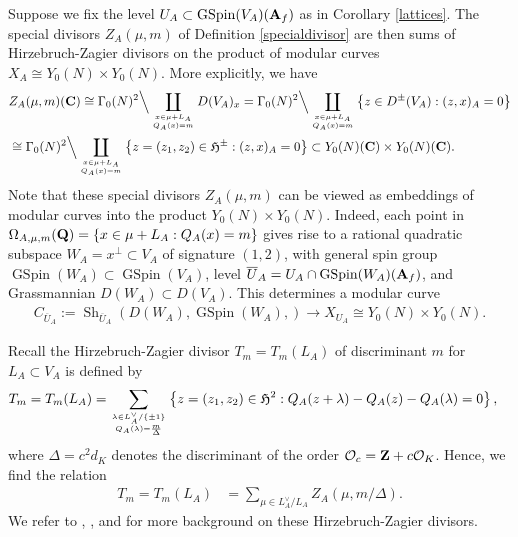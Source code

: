 \documentclass{amsart}
\theoremstyle{definition}
\newenvironment{remark}[1][Remark]{\begin{trivlist}
\item[\hskip \labelsep {\bfseries #1}]}{\end{trivlist}}
\begin{document}
Suppose we fix the level $U_A \subset \operatorname{GSpin}(V_A)({\bf{A}}_f)$ as in Corollary \ref{lattices}.
The special divisors $Z_A(\mu, m)$ of Definition \ref{specialdivisor} are then sums of Hirzebruch-Zagier divisors on the product of modular curves
$X_A \cong Y_0(N) \times Y_0(N)$. More explicitly, we have
\begin{equation*}\begin{aligned} &Z_A(\mu, m)({\bf{C}}) \cong \Gamma_0(N)^2 \Big\backslash \coprod\limits_{ x \in \mu + L_A \atop Q_A(x) = m } D(V_A)_x
= \Gamma_0(N)^2 \Big\backslash \coprod\limits_{ x \in \mu + L_A \atop Q_A(x) = m } \left\lbrace z \in D^{\pm}(V_A): (z, x)_A =0 \right\rbrace \\
&\cong  \Gamma_0(N)^2 \Big\backslash \coprod\limits_{ x \in \mu + L_A \atop Q_A(x) = m } \left\lbrace z=(z_1, z_2) \in \mathfrak{H}^{\pm}: (z, x)_A=0 \right\rbrace
 \subset Y_0(N)({\bf{C}}) \times Y_0(N)({\bf{C}}). \end{aligned}\end{equation*}
Note that these special divisors $Z_A(\mu, m)$ can be viewed as embeddings of modular curves into the product $Y_0(N) \times Y_0(N)$.
Indeed, each point in $\Omega_{A, \mu, m}({\bf{Q}}) = \lbrace x \in \mu + L_A: Q_A(x) = m \rbrace$
gives rise to a rational quadratic subspace $W_A = x^{\perp} \subset V_A$ of signature $(1,2)$, with general spin group
$\operatorname{GSpin}(W_A) \subset \operatorname{GSpin}(V_A)$, level $\overline{U}_A = U_A \cap \operatorname{GSpin}(W_A)({\bf{A}}_f)$,
and Grassmannian $D(W_A) \subset D(V_A)$. This determines a modular curve
\begin{align*} C_{\overline{U}_A}:= \operatorname{Sh}_{\overline{U}_A}(D(W_A), \operatorname{GSpin}(W_A), )
\longrightarrow X_{U_A}  \cong Y_0(N) \times Y_0(N). \end{align*}

\begin{remark} Recall the Hirzebruch-Zagier divisor $T_m = T_m(L_A)$ of discriminant  $m$ for $L_A \subset V_A$ is defined by 
\begin{align}\label{HZ} T_m = T_m(L_A) 
&= \sum\limits_{ { \lambda \in L_A^{\vee}/ \lbrace \pm 1 \rbrace \atop Q_A(\lambda) = \frac{m}{\Delta}} }
\left\lbrace z = (z_1, z_2) \in \mathfrak{H}^2: Q_A(z+ \lambda) - Q_A(z) - Q_A(\lambda) = 0 \right\rbrace, \end{align}
where $\Delta = c^2 d_K$ denotes the discriminant of the order $\mathcal{O}_c = {\bf{Z}} + c \mathcal{O}_K$. Hence, we find the relation 
\begin{align*} T_m = T_m(L_A) &= \sum\limits_{ \mu \in L_A^{\vee} / L_A } Z_A(\mu, m/\Delta). \end{align*}
We refer to \cite[Definition 2.27]{Br}, \cite[$\S$3]{HY}, and \cite[$\S$8]{BY} for more background on these Hirzebruch-Zagier divisors. \end{remark}
  
\end{document}
